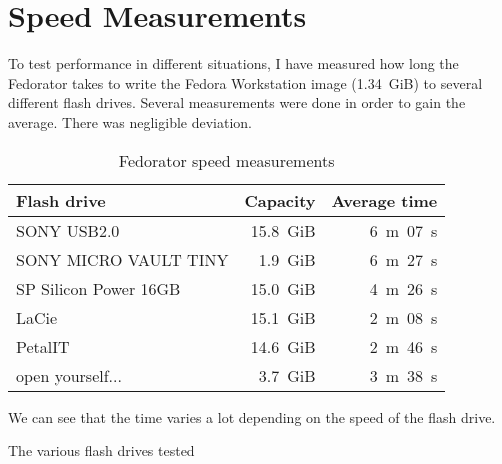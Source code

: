     \section{Speed Measurements}
        To test performance in different situations, I have measured how long the Fedorator takes to write the Fedora Workstation image (1.34~GiB) to several different flash drives.  Several measurements were done in order to gain the average.  There was negligible deviation.
        
        \begin{table}[htbp]
        \centering
        \caption{Fedorator speed measurements}
        \label{usb-duplicators}
            \begin{tabular}{ m{15em}  r r }
            \toprule
                \textbf{Flash drive} & \textbf{Capacity} & \textbf{Average time} \\
            \toprule
            
       SONY USB2.0              & 15.8~GiB & 6~m~07~s \\
\hline SONY MICRO VAULT TINY    &  1.9~GiB & 6~m~27~s \\
\hline SP Silicon Power 16GB    & 15.0~GiB & 4~m~26~s \\
\hline LaCie                    & 15.1~GiB & 2~m~08~s \\
\hline PetalIT                  & 14.6~GiB & 2~m~46~s \\
\hline open yourself...         &  3.7~GiB & 3~m~38~s \\
\hline
            \end{tabular}
        \end{table}
        
        We can see that the time varies a lot depending on the speed of the flash drive.
        
            {The various flash drives tested}
        
        
        \begin{comment}
        \todo{These are the final instructions that will be the "result" of the work.  Should they be inlined here?}
        \subsection{Bill of Materials}
            \todo{What is needed to get started - include a table and cost}
            \blind[3]
        \subsection{Step-by-step tutorial}
            \todo{The meat: how to build it from grounds up}
            \todo{Will not be present here, rather as an attachment.}
        \end{comment}
